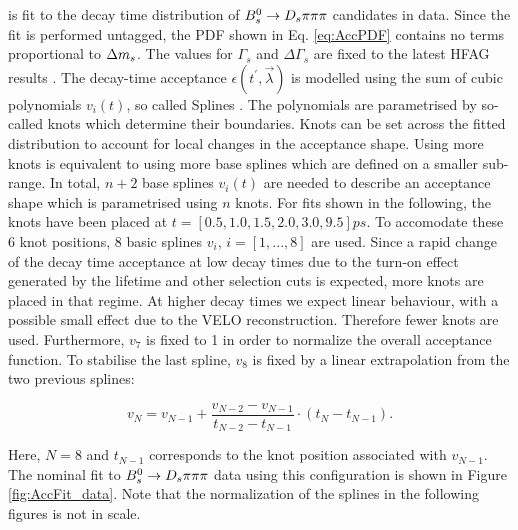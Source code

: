 is fit to the decay time distribution of ${{B}^0_{s}}\rightarrow{\ensuremath{{D}_{s}}}{\ensuremath{\pi}}{\ensuremath{\pi}}{\ensuremath{\pi}}$ candidates in data. 
Since the fit is performed untagged, the PDF shown in Eq. \ref{eq:AccPDF} contains no terms proportional to ${\Delta m_{{s}}}$. 
The values for $\Gamma_{s}$ and $\Delta\Gamma_{s}$ are fixed to the latest HFAG results \cite{HFAG}. 
The decay-time acceptance $\epsilon(t^{'}, \vec{\lambda})$ is modelled using the sum of cubic polynomials $v_{i}(t)$, so called Splines \cite{Karbach:2014qba}. 
The polynomials are parametrised by so-called knots which determine their boundaries. Knots can be set across the fitted distribution to account for local changes in the acceptance shape.
Using more knots is equivalent to using more base splines which are defined on a smaller sub-range. 
In total, $n+2$ base splines $v_{i}(t)$ are needed to describe an acceptance shape which is parametrised using $n$ knots.\newline
For fits shown in the following, the knots have been placed at $t = [0.5, 1.0, 1.5, 2.0, 3.0, 9.5] ps$. To accomodate these 6 knot positions, 8 basic splines $v_{i}$, $i = [1,...,8]$ are used.
Since a rapid change of the decay time acceptance at low decay times due to the turn-on effect generated by the lifetime and other selection cuts is expected, more knots are placed in that regime.
At higher decay times we expect linear behaviour, with a possible small effect due to the VELO reconstruction. Therefore fewer knots are used. 
Furthermore, $v_{7}$ is fixed to 1 in order to normalize the overall acceptance function. To stabilise the last spline, $v_{8}$ is fixed by a linear extrapolation from the two previous splines:

\begin{equation}   
v_{N} = v_{N-1} + \frac{v_{N-2} - v_{N-1}}{t_{N-2} - t_{N-1}} \cdot (t_{N} - t_{N-1}).
\label{eq:SplineExtra}
\end{equation}

Here, $N=8$ and $t_{N-1}$ corresponds to the knot position associated with $v_{N-1}$. 
The nominal fit to ${{B}^0_{s}}\rightarrow{\ensuremath{{D}_{s}}}{\ensuremath{\pi}}{\ensuremath{\pi}}{\ensuremath{\pi}}$ data using this configuration is shown in Figure \ref{fig:AccFit_data}. Note that the normalization of the splines in the following figures is not in scale.

